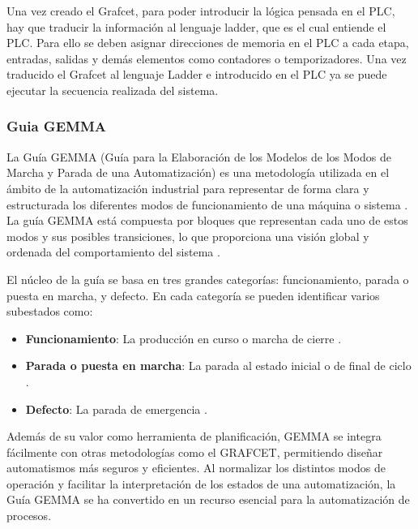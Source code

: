 Una vez creado el Grafcet, para poder introducir la lógica pensada en el PLC, hay que traducir la información al lenguaje ladder, que es el cual entiende el PLC. Para ello se deben asignar direcciones de memoria en el PLC a cada etapa, entradas, salidas y demás elementos como contadores o temporizadores. Una vez traducido el Grafcet al lenguaje Ladder e introducido en el PLC ya se puede ejecutar la secuencia realizada del sistema.

\subsubsection{Guia GEMMA}

La Guía GEMMA (Guía para la Elaboración de los Modelos de los Modos de Marcha y Parada de una Automatización) es una metodología utilizada en el ámbito de la automatización industrial para representar de forma clara y estructurada los diferentes modos de funcionamiento de una máquina o sistema  \cite{guia_gemma}. La guía GEMMA está compuesta por bloques que representan cada uno de estos modos y sus posibles transiciones, lo que proporciona una visión global y ordenada del comportamiento del sistema  \cite{guia_gemma}.

El núcleo de la guía se basa en tres grandes categorías: funcionamiento, parada o puesta en marcha, y defecto. En cada categoría se pueden identificar varios subestados como:

\begin{itemize}
  \item  \textbf{Funcionamiento}: La producción en curso o marcha de cierre \cite{guia_gemma}.
  \item \textbf{Parada o puesta en marcha}: La parada al estado inicial o de final de ciclo \cite{guia_gemma}.
  \item \textbf{Defecto}: La parada de emergencia \cite{guia_gemma}. 
\end{itemize} 

Además de su valor como herramienta de planificación, GEMMA se integra fácilmente con otras metodologías como el GRAFCET, permitiendo diseñar automatismos más seguros y eficientes. Al normalizar los distintos modos de operación y facilitar la interpretación de los estados de una automatización, la Guía GEMMA se ha convertido en un recurso esencial para la automatización de procesos.

